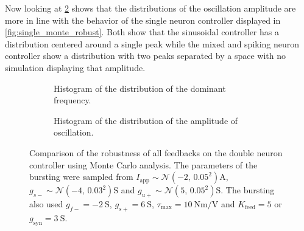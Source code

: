 Now looking at \cref{fig:double_monte_range_zoom} shows that the distributions of the oscillation amplitude are more in line with the behavior of the single neuron controller displayed in \cref{fig:single_monte_robust}.
Both show that the sinusoidal controller has a distribution centered around a single peak while the mixed and spiking neuron controller show a distribution with two peaks separated by a space with no simulation displaying that amplitude. 


\begin{figure}[!htbp]
    \centering
    \begin{subfigure}[b]{\textwidth}
        \centering
        \caption{Histogram of the distribution of the dominant frequency.}
        \label{fig:double_monte_freq_zoom}
    \end{subfigure}
    
    \begin{subfigure}[b]{\textwidth}
        \centering
        \caption{Histogram of the distribution of the amplitude of oscillation.}
        \label{fig:double_monte_range_zoom}
    \end{subfigure}
    \caption{Comparison of the robustness of all feedbacks on the double neuron controller using Monte Carlo analysis. 
    The parameters of the bursting were sampled from $I_\text{app} \sim \mathcal{N}\left(-2,\, 0.05^2\right) \unit{\ampere}$, $g_{s-} \sim \mathcal{N}\left(-4,\, 0.03^2\right) \unit{\siemens}$ and $g_{u+} \sim \mathcal{N}\left(5,\, 0.05^2\right) \unit{\siemens}$. 
    The bursting also used $g_{f-} = \qty{-2}{\siemens}$, $g_{s+} = \qty{6}{\siemens}$, $\tau_\text{max} = \qty{10}{\newton\meter\per\volt}$ and $K_\text{feed} = 5$ or $g_{\text{syn}} = \qty{3}{\siemens}$.}
    \label{fig:double_monte_zoom}
\end{figure}



